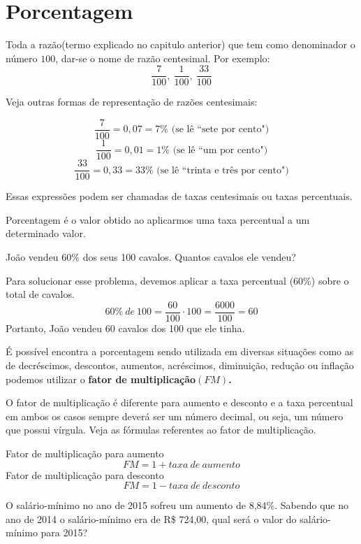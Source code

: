 \section{Porcentagem}
Toda a razão(termo explicado no capitulo anterior) que tem
como denominador o número $100$, dar-se o nome de razão centesimal. Por exemplo:
$$\frac{7}{100},~\frac{1}{100},~\frac{33}{100}$$

Veja outras formas de representação de razões centesimais:

$$\frac{7}{100}=0,07=7\% \textrm{ (se lê ``sete por cento")}$$
$$\frac{1}{100}=0,01=1\%\textrm{ (se lê ``um por cento")} $$
$$\frac{33}{100}=0,33=33\%\textrm{ (se lê ``trinta e três por cento")}$$

Essas expressões podem ser chamadas de taxas centesimais ou taxas percentuais. 

\begin{definition}
Porcentagem é o valor obtido ao aplicarmos uma taxa percentual a um determinado valor.

\end{definition}

\begin{example}
    João vendeu 60\% dos seus 100 cavalos. Quantos cavalos ele vendeu?
\end{example}

\begin{center}
    Para solucionar esse problema, devemos aplicar a taxa percentual (60\%) sobre o total de cavalos.
    $$60\%~de~100=\frac{60}{100}\cdot100=\frac{6000}{100}=60$$
    Portanto, João vendeu 60 cavalos dos 100 que ele tinha.
\end{center}

É possível encontra a porcentagem sendo utilizada em diversas situações como as de decréscimos, descontos, aumentos, acréscimos, diminuição, redução ou inflação podemos utilizar o \textbf{fator de multiplicação$(FM)$.}

\begin{definition}
O fator de multiplicação é diferente para aumento e desconto e a taxa percentual em ambos os casos sempre deverá ser um número decimal, ou seja, um número que possui vírgula. Veja as fórmulas referentes ao fator de multiplicação.

\end{definition}
\begin{center}
    Fator de multiplicação para aumento
    $$FM=1+taxa~de~aumento$$
    Fator de multiplicação para desconto
    $$FM=1-taxa~de~desconto$$
\end{center}
\begin{example}
    O salário-mínimo no ano de 2015 sofreu um aumento de 8,84\%. Sabendo que no ano de 2014 o salário-mínimo era de R\$ 724,00, qual será o valor do salário-mínimo para 2015?
\end{example}

